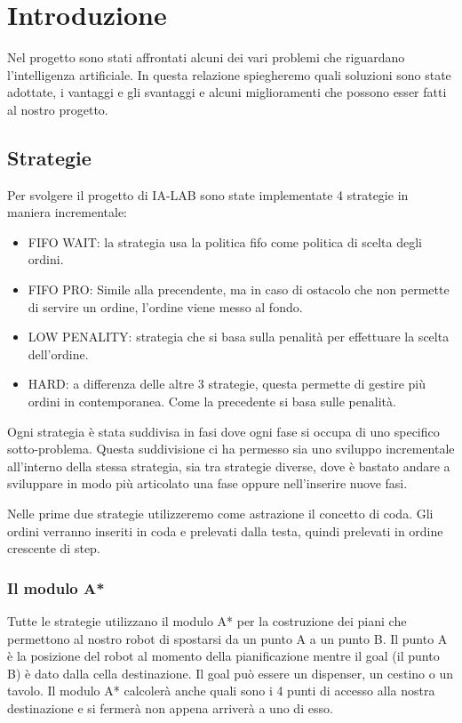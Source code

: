 \chapter{Introduzione}
Nel progetto sono stati affrontati alcuni dei vari problemi che riguardano l'intelligenza artificiale. In questa relazione spiegheremo quali soluzioni sono state adottate, i vantaggi e gli svantaggi e alcuni miglioramenti che possono esser fatti al nostro progetto.

\section{Strategie}
Per svolgere il progetto di IA-LAB sono state implementate 4 strategie in maniera incrementale:
\begin{itemize}
  \item FIFO WAIT: la strategia usa la politica fifo come politica di scelta degli ordini.
  \item FIFO PRO: Simile alla precendente, ma in caso di ostacolo che non permette di servire un ordine, l'ordine viene messo al fondo.
  \item LOW PENALITY: strategia che si basa sulla penalità per effettuare la scelta dell'ordine.
  \item HARD: a differenza delle altre 3 strategie, questa permette di gestire più ordini in contemporanea. Come la precedente si basa sulle penalità.
\end{itemize}

Ogni strategia è stata suddivisa in fasi dove ogni fase si occupa di uno specifico sotto-problema. Questa suddivisione ci ha permesso sia uno sviluppo incrementale all'interno della stessa strategia, sia tra strategie diverse, dove è bastato andare a sviluppare in modo più articolato una fase oppure nell'inserire nuove fasi.

Nelle prime due strategie utilizzeremo come astrazione il concetto di coda. Gli ordini verranno inseriti in coda e prelevati dalla testa, quindi prelevati in ordine crescente di step.

\subsection{Il modulo A*}
Tutte le strategie utilizzano il modulo A* per la costruzione dei piani che permettono al nostro robot di spostarsi da un punto A a un punto B. Il punto A è la posizione del robot al momento della pianificazione mentre il goal (il punto B) è dato dalla cella destinazione. Il goal può essere un dispenser, un cestino o un tavolo. Il modulo A* calcolerà anche quali sono i 4 punti di accesso alla nostra destinazione e si fermerà non appena arriverà a uno di esso.

